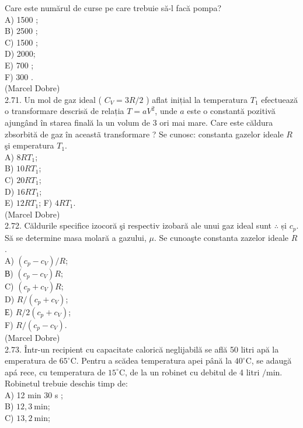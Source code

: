 \documentclass[10pt]{article}
\begin{document}
Care este numărul de curse pe care trebuie să-l facă pompa?\\
A) 1500 ;\\
B) 2500 ;\\
C) 1500 ;\\
D) 2000;\\
E) 700 ;\\
F) 300 .\\
(Marcel Dobre)\\
2.71. Un mol de gaz ideal ( $C_{V}=3 R / 2$ ) aflat inițial la temperatura $T_{1}$ efectuează o transformare descrisă de relația $T=a V^{2}$, unde $a$ este o constantă pozitivă ajungând în starea finală la un volum de 3 ori mai mare. Care este căldura\\
zbsorbită de gaz în aceastã transformare ? Se cunosc: constanta gazelor ideale $R$ şi emperatura $T_{1}$.\\
A) $8 R T_{1}$;\\
B) $10 R T_{1}$;\\
C) $20 R T_{1}$;\\
D) $16 R T_{1}$;\\
E) $12 R T_{1}$; F) $4 R T_{1}$.\\
(Marcel Dobre)\\
2.72. Căldurile specifice izocoră şi respectiv izobară ale unui gaz ideal sunt $\therefore$ și $c_{p}$. Să se determine masa molară a gazului, $\mu$. Se cunoaşte constanta zazelor ideale $R$.\\
A) $\left(c_{p}-c_{V}\right) / R$;\\
В) $\left(c_{p}-c_{V}\right) R$;\\
C) $\left(c_{p}+c_{V}\right) R$;\\
D) $R /\left(c_{p}+c_{V}\right)$;\\
Е) $R / 2\left(c_{p}+c_{V}\right)$;\\
F) $R /\left(c_{p}-c_{V}\right)$.\\
(Marcel Dobre)\\
2.73. Într-un recipient cu capacitate calorică neglijabilă se află 50 litri apă la emperatura de $65^{\circ} \mathrm{C}$. Pentru a scădea temperatura apei până la $40^{\circ} \mathrm{C}$, se adaugă apá rece, cu temperatura de $15^{\circ} \mathrm{C}$, de la un robinet cu debitul de 4 litri $/ \mathrm{min}$. Robinetul trebuie deschis timp de:\\
A) 12 min 30 s ;\\
B) $12,3 \mathrm{~min}$;\\
C) $13,2 \mathrm{~min}$;\\
\end{document}
